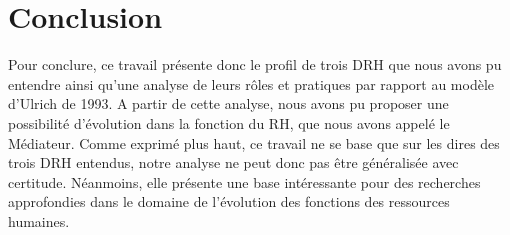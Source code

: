 \section*{Conclusion}

Pour conclure, ce travail présente donc le profil de trois DRH que nous avons pu entendre ainsi qu'une analyse de leurs rôles et pratiques par rapport au modèle d'Ulrich de 1993. A partir de cette analyse, nous avons pu proposer une possibilité d'évolution dans la fonction du RH, que nous avons appelé le \og{}Médiateur\fg{}.\newline
Comme exprimé plus haut, ce travail ne se base que sur les dires des trois DRH entendus, notre analyse ne peut donc pas être généralisée avec certitude. Néanmoins, elle présente une base intéressante pour des recherches approfondies dans le domaine de l'évolution des fonctions des ressources humaines.